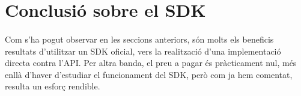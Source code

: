 \section{Conclusió sobre el SDK}

    \paragraph{}
    Com s'ha pogut observar en les seccions anteriors, són molts els beneficis resultats d'utilitzar un SDK oficial, vers la realització d'una implementació directa contra l’API. Per altra banda, el preu a pagar és pràcticament nul, més enllà d'haver d'estudiar el funcionament del SDK, però com ja hem comentat, resulta un esforç rendible.
